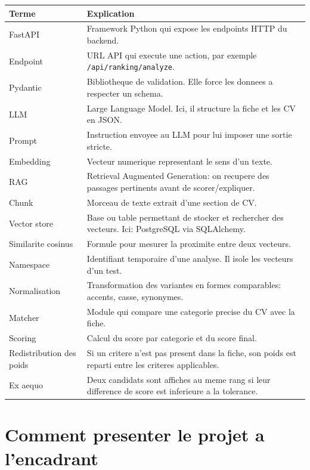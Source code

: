 \documentclass[12pt,a4paper]{article}
\begin{document}
\begin{longtable}{|p{4cm}|p{11cm}|}
\hline
\textbf{Terme} & \textbf{Explication} \\
\hline
FastAPI & Framework Python qui expose les endpoints HTTP du backend. \\
\hline
Endpoint & URL API qui execute une action, par exemple \texttt{/api/ranking/analyze}. \\
\hline
Pydantic & Bibliotheque de validation. Elle force les donnees a respecter un schema. \\
\hline
LLM & Large Language Model. Ici, il structure la fiche et les CV en JSON. \\
\hline
Prompt & Instruction envoyee au LLM pour lui imposer une sortie stricte. \\
\hline
Embedding & Vecteur numerique representant le sens d'un texte. \\
\hline
RAG & Retrieval Augmented Generation: on recupere des passages pertinents avant de scorer/expliquer. \\
\hline
Chunk & Morceau de texte extrait d'une section de CV. \\
\hline
Vector store & Base ou table permettant de stocker et rechercher des vecteurs. Ici: PostgreSQL via SQLAlchemy. \\
\hline
Similarite cosinus & Formule pour mesurer la proximite entre deux vecteurs. \\
\hline
Namespace & Identifiant temporaire d'une analyse. Il isole les vecteurs d'un test. \\
\hline
Normalisation & Transformation des variantes en formes comparables: accents, casse, synonymes. \\
\hline
Matcher & Module qui compare une categorie precise du CV avec la fiche. \\
\hline
Scoring & Calcul du score par categorie et du score final. \\
\hline
Redistribution des poids & Si un critere n'est pas present dans la fiche, son poids est reparti entre les criteres applicables. \\
\hline
Ex aequo & Deux candidats sont affiches au meme rang si leur difference de score est inferieure a la tolerance. \\
\hline
\end{longtable}

\section{Comment presenter le projet a l'encadrant}
\end{document}
